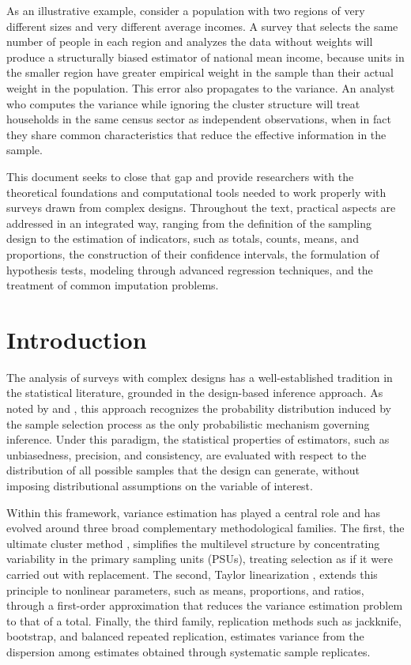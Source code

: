 \documentclass[
  english,
  12pt,
]{book}
\begin{document}
As an illustrative example, consider a population with two regions of very different sizes and very different average incomes. A survey that selects the same number of people in each region and analyzes the data without weights will produce a structurally biased estimator of national mean income, because units in the smaller region have greater empirical weight in the sample than their actual weight in the population. This error also propagates to the variance. An analyst who computes the variance while ignoring the cluster structure will treat households in the same census sector as independent observations, when in fact they share common characteristics that reduce the effective information in the sample.

This document seeks to close that gap and provide researchers with the theoretical foundations and computational tools needed to work properly with surveys drawn from complex designs. Throughout the text, practical aspects are addressed in an integrated way, ranging from the definition of the sampling design to the estimation of indicators, such as totals, counts, means, and proportions, the construction of their confidence intervals, the formulation of hypothesis tests, modeling through advanced regression techniques, and the treatment of common imputation problems.

\chapter{Introduction}\label{cap1}

The analysis of surveys with complex designs has a well-established tradition in the statistical literature, grounded in the design-based inference approach. As noted by \citet{sarndal2003model} and \citet{Gutierrez2016}, this approach recognizes the probability distribution induced by the sample selection process as the only probabilistic mechanism governing inference. Under this paradigm, the statistical properties of estimators, such as unbiasedness, precision, and consistency, are evaluated with respect to the distribution of all possible samples that the design can generate, without imposing distributional assumptions on the variable of interest.

Within this framework, variance estimation has played a central role and has evolved around three broad complementary methodological families. The first, the ultimate cluster method \citep{hansen1953sample}, simplifies the multilevel structure by concentrating variability in the primary sampling units (PSUs), treating selection as if it were carried out with replacement. The second, Taylor linearization \citep{binder1983variances}, extends this principle to nonlinear parameters, such as means, proportions, and ratios, through a first-order approximation that reduces the variance estimation problem to that of a total. Finally, the third family, replication methods such as jackknife, bootstrap, and balanced repeated replication, estimates variance from the dispersion among estimates obtained through systematic sample replicates.
\end{document}
